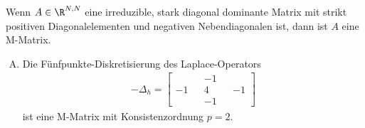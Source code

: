 \begin{Satz}
    \label{satz:2.3}
    Wenn $A\in \R^{N, N}$ eine irreduzible, stark diagonal dominante Matrix mit
    strikt positiven Diagonalelementen und negativen Nebendiagonalen ist, dann
    ist $A$ eine M-Matrix.
\end{Satz}


\begin{Anwendung}
    \begin{enumerate}[A)]
	\item
	    Die Fünfpunkte-Diskretisierung des Laplace-Operators
	    \begin{eqnarray*}
            -\Delta_h = \begin{bmatrix}
                    & & -1 & & \\
                    -1 & & 4 & & -1 \\
                    & & -1 & &
                        \end{bmatrix}
	    \end{eqnarray*}
	    ist eine M-Matrix mit Konsistenzordnung $p = 2$.


\end{enumerate}
\end{Anwendung}
